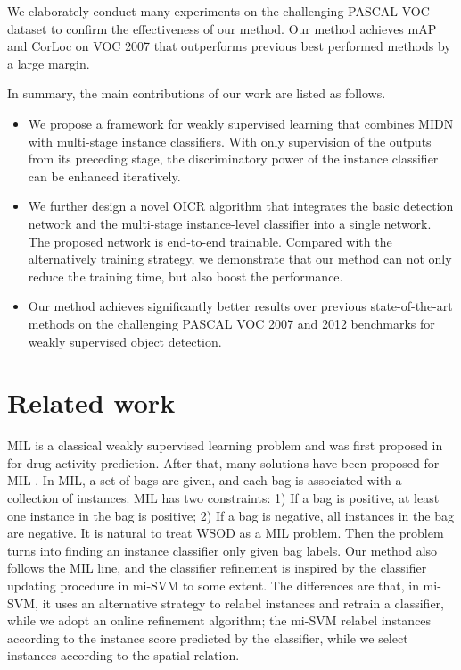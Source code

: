 \documentclass[10pt,twocolumn,letterpaper]{article}
\begin{document}
We elaborately conduct many experiments on the challenging PASCAL VOC dataset to confirm the effectiveness of our method.
Our method achieves  mAP and  CorLoc on VOC 2007 that outperforms previous best performed methods by a large margin.

In summary, the main contributions of our work are listed as follows.
\begin{itemize}
   \item We propose a framework for weakly supervised learning that combines MIDN with multi-stage instance classifiers.
   With only supervision of the outputs from its preceding stage, the discriminatory power of the instance classifier can be enhanced iteratively.
   \item We further design a novel OICR algorithm that integrates the basic detection network and the multi-stage instance-level classifier into a single network.
   The proposed network is end-to-end trainable.
   Compared with the alternatively training strategy, we demonstrate that our method can not only reduce the training time, but also boost the performance.
   \item Our method achieves significantly better results over previous state-of-the-art methods on the challenging PASCAL VOC 2007 and 2012 benchmarks for weakly supervised object detection.
\end{itemize}



\section{Related work}
\label{sec:related_work}


MIL is a classical weakly supervised learning problem and was first proposed in \cite{Ref:Dietterich1997} for drug activity prediction.
After that, many solutions have been proposed for MIL \cite{Ref:Andrews2002,Ref:Wang2015,Ref:Zhang2001}.
In MIL, a set of bags are given, and each bag is associated with a collection of instances.
MIL has two constraints:
1) If a bag is positive, at least one instance in the bag is positive;
2) If a bag is negative, all instances in the bag are negative.
It is natural to treat WSOD as a MIL problem.
Then the problem turns into finding an instance classifier only given bag labels.
Our method also follows the MIL line, and the classifier refinement is inspired by the classifier updating procedure in mi-SVM \cite{Ref:Andrews2002} to some extent.
The differences are that, in mi-SVM, it uses an alternative strategy to relabel instances and retrain a classifier, while we adopt an online refinement algorithm; the mi-SVM relabel instances according to the instance score predicted by the classifier, while we select instances according to the spatial relation.
\end{document}

